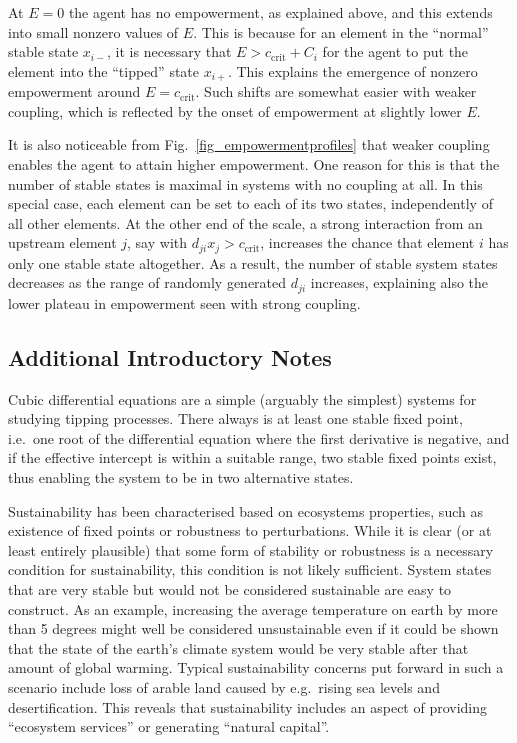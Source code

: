 \documentclass[conference]{IEEEtran}
\newcommand{\ccrit}{\ensuremath{c_{\mathrm{crit}}}}
\begin{document}
At $E = 0$ the agent has no empowerment, as explained above, and this
extends into small nonzero values of $E$. This is because for an
element in the ``normal'' stable state $x_{i-}$, it is necessary that
$E > \ccrit + C_i$ for the agent to put the element into the
``tipped'' state $x_{i+}$. This explains the emergence of nonzero
empowerment around $E = \ccrit$. Such shifts are somewhat easier with
weaker coupling, which is reflected by the onset of empowerment at
slightly lower $E$.

It is also noticeable from Fig.~\ref{fig_empowermentprofiles} that
weaker coupling enables the agent to attain higher empowerment. One
reason for this is that the number of stable states is maximal in
systems with no coupling at all. In this special case, each element
can be set to each of its two states, independently of all other
elements. At the other end of the scale, a strong interaction from an
upstream element $j$, say with $d_{ji} x_j > \ccrit$, increases the
chance that element $i$ has only one stable state altogether. As a
result, the number of stable system states decreases as the range of
randomly generated $d_{ji}$ increases, explaining also the lower
plateau in empowerment seen with strong coupling.


\subsection{Additional Introductory Notes}

Cubic differential equations are a simple (arguably the simplest)
systems for studying tipping processes. There always is at least one
stable fixed point, i.e.\ one root of the differential equation where
the first derivative is negative, and if the effective intercept is
within a suitable range, two stable fixed points exist, thus enabling
the system to be in two alternative states.

Sustainability has been characterised based on ecosystems properties,
such as existence of fixed points or robustness to perturbations.
While it is clear (or at least entirely plausible) that some form of
stability or robustness is a necessary condition for sustainability,
this condition is not likely sufficient. System states that are very
stable but would not be considered sustainable are easy to construct.
As an example, increasing the average temperature on earth by more
than 5 degrees might well be considered unsustainable even if it could
be shown that the state of the earth's climate system would be very
stable after that amount of global warming. Typical sustainability
concerns put forward in such a scenario include loss of arable land
caused by e.g.\ rising sea levels and desertification. This reveals
that sustainability includes an aspect of providing ``ecosystem
services'' or generating ``natural capital''.
\end{document}
